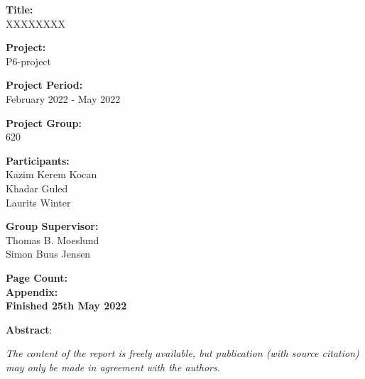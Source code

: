 \begin{minipage}[t]{0.48\textwidth}
\textbf{Title:} \\[5pt]\bigskip\hspace{2ex}
XXXXXXXX

\textbf{Project:} \\[5pt]\bigskip\hspace{2ex}
P6-project

\textbf{Project Period:} \\[5pt]\bigskip\hspace{2ex}
February 2022 - May 2022 %

\textbf{Project Group:} \\[5pt]\bigskip\hspace{2ex}
620

\textbf{Participants:} \\[5pt]\hspace*{2ex}
Kazim Kerem Kocan \\\hspace*{2ex}
Khadar Guled \\\hspace*{2ex}
Laurits Winter \\\bigskip\hspace*{2ex}

\textbf{Group Supervisor:} \\[5pt]\hspace*{2ex}
Thomas B. Moeslund \\\hspace*{2ex}
Simon Buus Jensen\\\bigskip\hspace{2ex}


\vspace*{1cm}

\textbf{Page Count: } \\
\textbf{Appendix: } \\ 
\textbf{Finished 25th May 2022}

\end{minipage}
\hfill
\begin{minipage}[t]{0.483\textwidth}
\textbf{Abstract}: \\[5pt]
\fbox{\parbox{7cm}{\bigskip\bigskip}}
\end{minipage}

\vfill

{\scriptsize\itshape The content of the report is freely available, but publication (with source citation) may only be made in agreement with the authors.}



